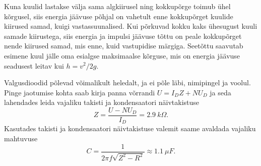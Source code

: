 \documentclass[10pt]{article}
\begin{document}

\solu
Kuna kuulid lastakse välja sama algkiirusel ning kokkupõrge toimub ühel kõrgusel, siis energia jäävuse põhjal on vahetult enne kokkupõrget kuulide kiirused samad, kuigi vastassuunalised. Kui põrkuvad kokku kaks ühesugust kuuli samade kiirustega, siis energia ja impulsi jäävuse tõttu on peale kokkupõrget nende kiirused samad, mis enne, kuid vastupidise märgiga. Seetõttu saavutab esimene kuul jälle oma esialgse maksimaalse kõrguse, mis on energia jäävuse seadusest leitav kui $h=v^2/2g$.

\probend
\bigskip


\solu
Valgusdioodid põlevad võimalikult heledalt, ja ei põle läbi, nimipingel
ja voolul. Pinge jaotumise kohta saab kirja panna võrrandi $U=I_{D}Z+NU_{D}$
ja seda lahendades leida vajaliku takisti ja kondensaatori näivtakistuse 
\begin{equation*}
Z=\frac{U-NU_{D}}{I_{D}}=\SI{2.9}{k\Omega}.
\end{equation*}
Kasutades takisti ja kondensaatori näivtakistuse valemit saame avaldada
vajaliku mahtuvuse
\begin{equation*}
C=\frac{1}{2\pi f\sqrt{Z^{2}-R^{2}}}\approx\SI{1.1}{\mu F}.
\end{equation*}
\probend
\bigskip
\end{document}
